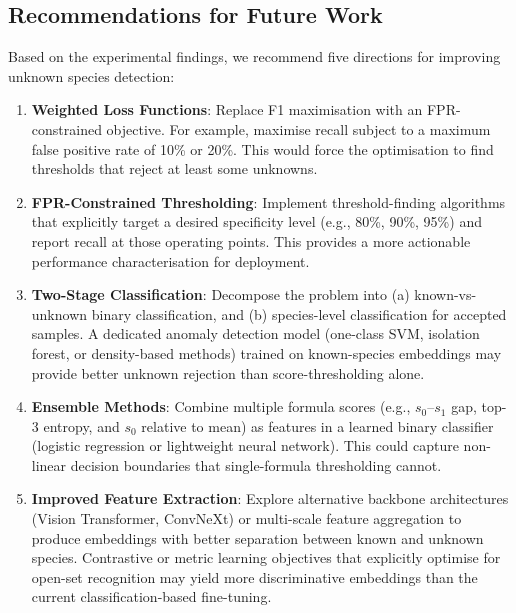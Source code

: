 \documentclass[11pt,a4paper]{article}
\begin{document}
\subsection{Recommendations for Future Work}

Based on the experimental findings, we recommend five directions for improving unknown species detection:

\begin{enumerate}
  \item \textbf{Weighted Loss Functions}: Replace F1 maximisation with an FPR-constrained objective. For example, maximise recall subject to a maximum false positive rate of 10\% or 20\%. This would force the optimisation to find thresholds that reject at least some unknowns.
  
  \item \textbf{FPR-Constrained Thresholding}: Implement threshold-finding algorithms that explicitly target a desired specificity level (e.g., 80\%, 90\%, 95\%) and report recall at those operating points. This provides a more actionable performance characterisation for deployment.
  
  \item \textbf{Two-Stage Classification}: Decompose the problem into (a) known-vs-unknown binary classification, and (b) species-level classification for accepted samples. A dedicated anomaly detection model (one-class SVM, isolation forest, or density-based methods) trained on known-species embeddings may provide better unknown rejection than score-thresholding alone.
  
  \item \textbf{Ensemble Methods}: Combine multiple formula scores (e.g., $s_0$--$s_1$ gap, top-3 entropy, and $s_0$ relative to mean) as features in a learned binary classifier (logistic regression or lightweight neural network). This could capture non-linear decision boundaries that single-formula thresholding cannot.
  
  \item \textbf{Improved Feature Extraction}: Explore alternative backbone architectures (Vision Transformer, ConvNeXt) or multi-scale feature aggregation to produce embeddings with better separation between known and unknown species. Contrastive or metric learning objectives that explicitly optimise for open-set recognition may yield more discriminative embeddings than the current classification-based fine-tuning.
\end{enumerate}

\end{document}
